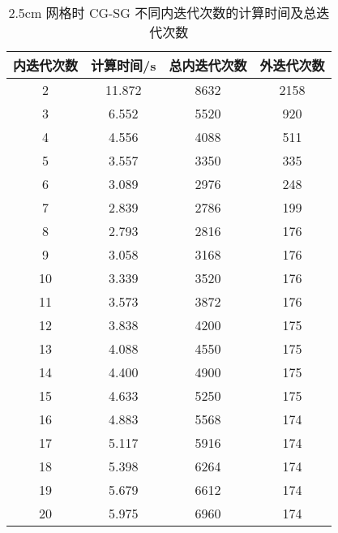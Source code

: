 \begin{datasheet}
\begin{table}
\centering
\caption{2.5cm 网格时 CG-SG 不同内迭代次数的计算时间及总迭代次数}
\label{tab:equsolve.iter.cg-sg.2.5cm}
\begin{tabular}{cccc}
\toprule
内迭代次数 & 计算时间/s & 总内迭代次数 & 外迭代次数\\
\midrule
2 & 11.872 & 8632 & 2158\\
3 & 6.552 & 5520 & 920\\
4 & 4.556 & 4088 & 511\\
5 & 3.557 & 3350 & 335\\
6 & 3.089 & 2976 & 248\\
7 & 2.839 & 2786 & 199\\
8 & 2.793 & 2816 & 176\\
9 & 3.058 & 3168 & 176\\
10 & 3.339 & 3520 & 176\\
11 & 3.573 & 3872 & 176\\
12 & 3.838 & 4200 & 175\\
13 & 4.088 & 4550 & 175\\
14 & 4.400 & 4900 & 175\\
15 & 4.633 & 5250 & 175\\
16 & 4.883 & 5568 & 174\\
17 & 5.117 & 5916 & 174\\
18 & 5.398 & 6264 & 174\\
19 & 5.679 & 6612 & 174\\
20 & 5.975 & 6960 & 174\\
\bottomrule
\end{tabular}
\end{table}


\end{datasheet}
